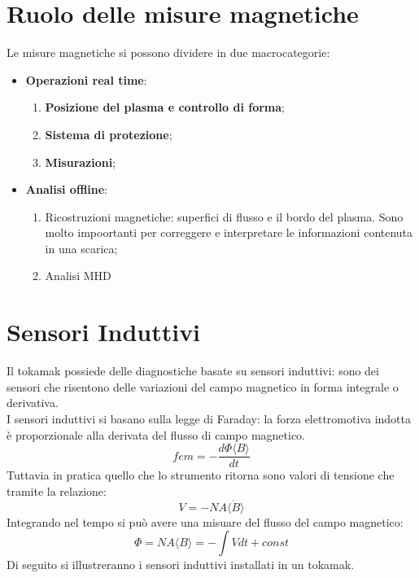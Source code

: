 \documentclass{article}
\begin{document}
\section{Ruolo delle misure magnetiche}
Le misure magnetiche si possono dividere in due macrocategorie:
\begin{itemize}
	\item \textbf{Operazioni real time}:\begin{enumerate}
		      \item \textbf{Posizione del plasma e controllo di forma};
		      \item \textbf{Sistema di protezione};
		      \item \textbf{Misurazioni};
	      \end{enumerate}
	\item \textbf{Analisi offline}:
	      \begin{enumerate}
		      \item Ricostruzioni magnetiche: superfici di flusso e il bordo del plasma. Sono molto impoortanti per correggere e interpretare le informazioni contenuta in una scarica;
		      \item Analisi MHD
	      \end{enumerate}
\end{itemize}
\section{Sensori Induttivi}
Il tokamak possiede delle diagnostiche basate su sensori induttivi: sono dei sensori che risentono delle variazioni del campo magnetico in forma integrale o derivativa.\\
I sensori induttivi si basano sulla legge di Faraday: la forza elettromotiva indotta è proporzionale alla derivata del flusso di campo magnetico.\begin{equation}
	fem=-\frac{d \Phi\langle B\rangle }{dt}
\end{equation}
Tuttavia in pratica quello che lo strumento ritorna sono valori di tensione che tramite la relazione:
\begin{equation}
	V=-NA\langle \dot{B}\rangle
\end{equation}
Integrando nel tempo si può avere una misuare del flusso del campo magnetico:\begin{equation}
	\Phi=NA\langle B\rangle =-\int Vdt+const
\end{equation}
Di seguito si illustreranno i sensori induttivi installati in un tokamak.
\end{document}
